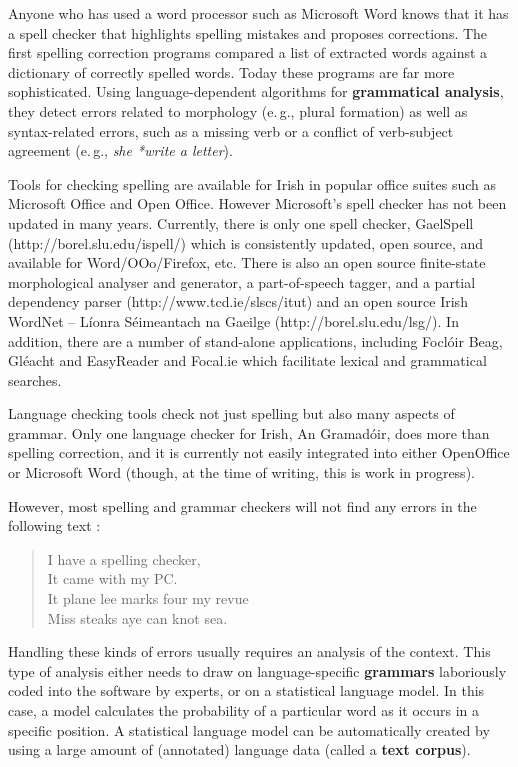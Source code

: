 \begin{multicols}{2}
Anyone who has used a word processor such as Microsoft Word knows that it has a spell checker that highlights spelling mistakes and proposes corrections. The first spelling correction programs compared a list of extracted words against a dictionary of correctly spelled words. Today these programs are far more sophisticated. Using language-dependent algorithms for \textbf{grammatical analysis}, they detect errors related to morphology (e.\,g., plural formation) as well as syntax-related errors, such as a missing verb or a conflict of verb-subject agreement (e.\,g., \textit{she *write a letter}). 

Tools for checking spelling are available for Irish in popular office suites such as Microsoft Office and Open Office. However Microsoft's spell checker has not been updated in many years. Currently, there is only one spell checker, GaelSpell (http://borel.slu.edu/ispell/) which is consistently updated, open source, and available for Word/OOo/Firefox, etc. There is also an open source finite-state morphological analyser and generator, a part-of-speech tagger, and a partial dependency parser (http://www.tcd.ie/slscs/itut) and an open source Irish WordNet -- Líonra Séimeantach na Gaeilge  (http://borel.slu.edu/lsg/). In addition, there are a number of stand-alone applications, including Foclóir Beag, Gléacht and EasyReader and Focal.ie which facilitate lexical and grammatical searches. 

Language checking tools check not just spelling but also many aspects of grammar. Only one language checker for Irish, An Gramadóir,  \cite{gramadoir} does more than spelling correction, and it is currently not easily integrated into either OpenOffice or Microsoft Word (though, at the time of writing, this is work in progress).


However, most spelling and grammar checkers will not find any errors in the following text \cite{zar1}:

\begin{quote}
  I have a spelling checker,\\
  It came with my PC.\\
  It plane lee marks four my revue\\
  Miss steaks aye can knot sea.
\end{quote}

Handling these kinds of errors usually requires an analysis of the context. This type of analysis either needs to draw on language-specific \textbf{grammars} laboriously coded into the software by experts, or on a statistical language model. In this case, a model calculates the probability of a particular word as it occurs in a specific position. A statistical language model can be automatically created by using a large amount of (annotated) language data (called a \textbf{text corpus}). 


\end{multicols}
